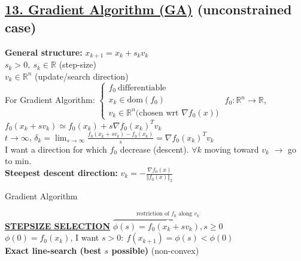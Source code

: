 \documentclass[a4paper]{article}
\begin{document}
\subsection*{\underline{13. Gradient Algorithm (GA)} (\textsf{unconstrained case})}
\vspace{-0.3cm}
\begin{multicols}{2}
    \noindent
    \textbf{General structure: } $x_{k+1}=x_k + s_k{v_k}$\\
    $s_k>0, \ s_k \in \mathbb{R}$ (step-size)\\
    $v_k\in\mathbb{R}^n$ (update/search direction)\\
    For Gradient Algorithm: $\begin{cases}
        f_0 \ \text{differentiable}\\
        x_k \in \text{dom}(f_0)\\
        v_k \in \mathbb{R}^n \text{(chosen wrt $\nabla{f_0(x)}$)} 
    \end{cases}$
    $f_0:\mathbb{R}^n\to\mathbb{R}$, $f_0(x_k+s{v_k})\simeq{f_0(x_k)}+s\nabla{f_0(x_k)}^T{v_k}$\\
    $t\to\infty$, $\delta_k=\lim_{s\to\infty}{\frac{f_0(x_k+sv_k)-f_0(x_k)}{s}}=\nabla{f_0}(x_k)^T{v_k}$\\
    I want a direction for which $f_0$ decrease (descent). $\forall{k}$ moving toward $v_k$ $\to$ go to min.\\
    \textbf{Steepest descent direction:} $v_k=-\frac{\nabla{f_0}(x)}{\Vert f_0(x) \Vert_2}$
    \begin{algorithm}[H]
        \caption{Gradient Algorithm}
        \begin{algorithmic}[1]
            \Else 
            \EndIf
        \end{algorithmic}
    \end{algorithm}
    \vspace{-0.3cm}
    \noindent
    \textbf{\underline{STEPSIZE SELECTION}} $\overbrace{\phi(s)=f_0(x_k+s{v_k}), s\ge0}^{\text{restriction of $f_0$ along $v_k$}}$\\
    $\phi(0)=f_0(x_k)$, I want $s>0: \ f(x_{k+1})=\phi(s)<\phi(0)$\\
    \textbf{Exact line-search (best $s$ possible)} (non-convex)

\end{multicols}
\end{document}
